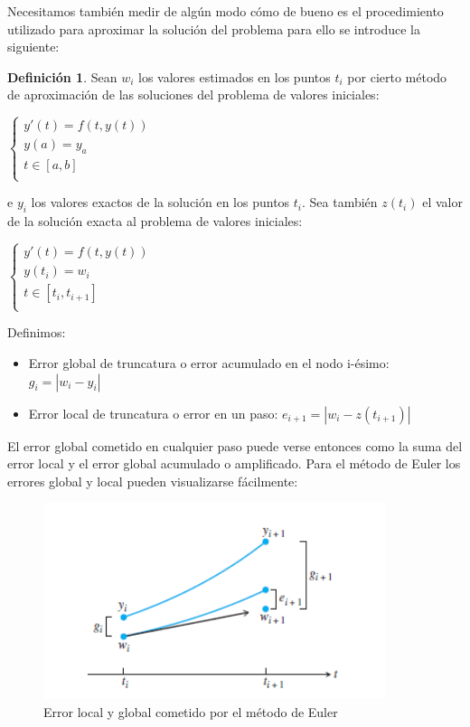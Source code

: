 \documentclass{article}
\theoremstyle{theorem-style}  %
\theoremstyle{definition}
\newtheorem{definition}{Definición}[section]
\theoremstyle{example-style}
\begin{document}
	Necesitamos también medir de algún modo cómo de bueno es el procedimiento utilizado para aproximar la solución del problema para ello se introduce la siguiente: \\
	
	\begin{definition} Sean $w_i$ los valores estimados en los puntos $t_i$ por cierto método de aproximación de las soluciones del problema de valores iniciales:
		\begin{center}
		$\begin{cases}
		y'(t) = f(t,y(t)) \\
		y(a) = y_a \\
		t \in [a,b] \\
		\end{cases}$
		\end{center}
	e $y_i$ los valores exactos de la solución en los puntos $t_i$. Sea también $z(t_i)$ el valor de la solución exacta al problema de valores iniciales:
		\begin{center}
		$\begin{cases}
		y'(t) = f(t,y(t)) \\
		y(t_i) = w_i \\
		t \in [t_i,t_{i+1}] \\
		\end{cases}$
		\end{center}
	Definimos:
	\begin{itemize}
	\item Error global de truncatura o error acumulado en el nodo i-ésimo: $g_i=|w_i-y_i|$
	\item Error local de truncatura o error en un paso: $e_{i+1} = |w_i-z(t_{i+1})|$
	\end{itemize} 
	\end{definition}
	
	El error global cometido en cualquier paso puede verse entonces como la suma del error local y el error global acumulado o amplificado. Para el método de Euler los errores global y local pueden visualizarse fácilmente:
	
	\begin{figure}[h]
	\centering
	\includegraphics[width=10cm]{./Images/error-euler.png}
	\caption{Error local y global cometido por el método de Euler} 
	\label{fig:error-euler}
	\end{figure}
	
\end{document}
